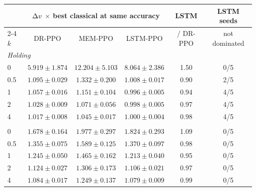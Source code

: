 \begin{tabular}{lccccc}
\toprule
 & \multicolumn{3}{c}{$\Delta v$ $\times$ best classical at same accuracy} & LSTM & LSTM seeds \\
\cmidrule(lr){2-4}
$k$ & DR-PPO & MEM-PPO & LSTM-PPO & / DR-PPO & not dominated \\
\midrule
\multicolumn{6}{l}{\emph{Holding}} \\
0 & $5.919 \pm 1.874$ & $12.204 \pm 5.103$ & $8.064 \pm 2.386$ & 1.50 & 0/5 \\
0.5 & $1.095 \pm 0.029$ & $1.332 \pm 0.200$ & $1.008 \pm 0.017$ & 0.90 & 2/5 \\
1 & $1.057 \pm 0.016$ & $1.151 \pm 0.104$ & $0.996 \pm 0.005$ & 0.94 & 4/5 \\
2 & $1.028 \pm 0.009$ & $1.071 \pm 0.056$ & $0.998 \pm 0.005$ & 0.97 & 4/5 \\
4 & $1.017 \pm 0.008$ & $1.045 \pm 0.017$ & $1.000 \pm 0.004$ & 0.98 & 4/5 \\
\addlinespace
\multicolumn{6}{l}{\emph{Recovery}} \\
0 & $1.678 \pm 0.164$ & $1.977 \pm 0.297$ & $1.824 \pm 0.293$ & 1.09 & 0/5 \\
0.5 & $1.355 \pm 0.075$ & $1.589 \pm 0.125$ & $1.370 \pm 0.097$ & 0.98 & 0/5 \\
1 & $1.245 \pm 0.050$ & $1.465 \pm 0.162$ & $1.213 \pm 0.040$ & 0.95 & 0/5 \\
2 & $1.124 \pm 0.027$ & $1.306 \pm 0.173$ & $1.106 \pm 0.021$ & 0.97 & 0/5 \\
4 & $1.084 \pm 0.017$ & $1.249 \pm 0.137$ & $1.079 \pm 0.009$ & 0.99 & 0/5 \\
\bottomrule
\end{tabular}
